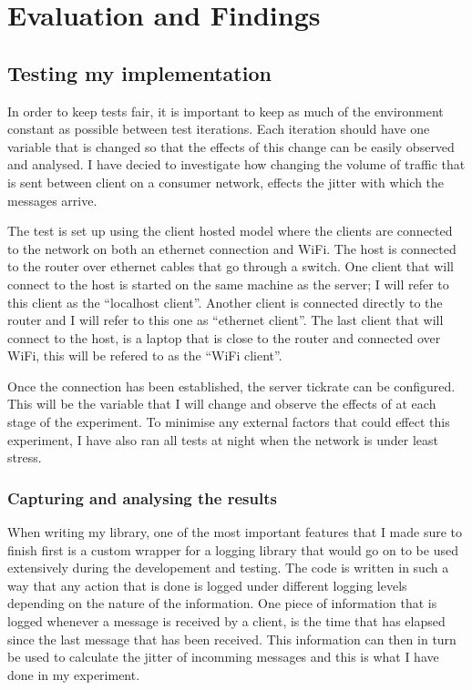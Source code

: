 \chapter{Evaluation and Findings}



\section{Testing my implementation}
In order to keep tests fair, it is important to keep as much of the environment constant as possible between test iterations. Each iteration should have one variable that is changed so that the effects of this change can be easily observed and analysed. I have decied to investigate how changing the volume of traffic that is sent between client on a consumer network, effects the jitter with which the messages arrive.

The test is set up using the client hosted model where the clients are connected to the network on both an ethernet connection and WiFi. The host is connected to the router over ethernet cables that go through a switch. One client that will connect to the host is started on the same machine as the server; I will refer to this client as the ``localhost client''. Another client is connected directly to the router and I will refer to this one as ``ethernet client''. The last client that will connect to the host, is a laptop that is close to the router and connected over WiFi, this will be refered to as the ``WiFi client''.

Once the connection has been established, the server tickrate can be configured. This will be the variable that I will change and observe the effects of at each stage of the experiment. To minimise any external factors that could effect this experiment, I have also ran all tests at night when the network is under least stress.

\subsection{Capturing and analysing the results}
When writing my library, one of the most important features that I made sure to finish first is a custom wrapper for a logging library that would go on to be used extensively during the developement and testing. The code is written in such a way that any action that is done is logged under different logging levels depending on the nature of the information. One piece of information that is logged whenever a message is received by a client, is the time that has elapsed since the last message that has been received. This information can then in turn be used to calculate the jitter of incomming messages and this is what I have done in my experiment.

